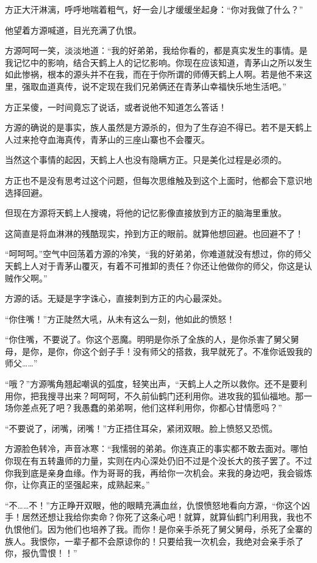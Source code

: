 \begin{this_body}
方正大汗淋漓，呼呼地喘着粗气，好一会儿才缓缓坐起身：“你对我做了什么？”

他望着方源喊道，目光充满了仇恨。

方源呵呵一笑，淡淡地道：“我的好弟弟，我给你看的，都是真实发生的事情。是我记忆中的影响，结合天鹤上人的记忆影响。你现在应该知道，青茅山之所以发生如此惨祸，根本的源头并不在我，而在于你所谓的师傅天鹤上人啊。若是他不来这里，强取血道真传，说不定现在我们兄弟俩还在青茅山幸福快乐地生活吧。”

方正呆傻，一时间竟忘了说话，或者说他不知道怎么答话！

方源的确说的是事实，族人虽然是方源杀的，但为了生存迫不得已。若不是天鹤上人过来抢夺血海真传，青茅山的三座山寨也不会覆灭。

当然这个事情的起因，天鹤上人也没有隐瞒方正。只是美化过程是必须的。

方正也不是没有思考过这个问题，但每次思维触及到这个上面时，他都会下意识地选择回避。

但现在方源将天鹤上人搜魂，将他的记忆影像直接放到方正的脑海里重放。

这简直是将血淋淋的残酷现实，拎到方正的眼前。就算他想回避。也回避不了！

“呵呵呵。”空气中回荡着方源的冷笑，“我的好弟弟，你难道就没有想过，你的师父天鹤上人对于青茅山覆灭，有着不可推卸的责任？你还让他做你的师父，你这是认贼作父啊。”

方源的话。无疑是字字诛心，直接刺到方正的内心最深处。

“你住嘴！”方正陡然大吼，从未有这么一刻，他如此的愤怒！

“你住嘴，不要说了。你这个恶魔。明明是你杀了全族的人，是你杀害了舅父舅母，是你，是你，你这个刽子手！没有师父的搭救，我早就死了。不准你诋毁我的师父……”

“哦？”方源嘴角翘起嘲讽的弧度，轻笑出声，“天鹤上人之所以救你。还不是要利用你，把我搜寻出来？呵呵呵，不久前仙鹤门还利用你。进攻我的狐仙福地。那一场你差点死了吧？我愚蠢的弟弟啊，他们这样利用你，你都心甘情愿吗？”

“不要说了，闭嘴，闭嘴！”方正捂住耳朵，紧闭双眼。脸上愤怒又恐慌。

方源脸色转冷，声音冰寒：“我懦弱的弟弟。你连真正的事实都不敢去面对。哪怕你现在有五转蛊师的力量，实则在内心深处仍旧不过是个没长大的孩子罢了。不过你我到底是亲身血缘。作为哥哥的我，再给你一次机会。来我的身边吧，我会锻炼你，让你真正的坚强起来，成熟起来。”

“不……不！”方正睁开双眼，他的眼睛充满血丝，仇恨愤怒地看向方源，“你这个凶手！居然还想让我给你卖命？你死了这条心吧！就算，就算仙鹤门利用我，我也不仇恨他们。因为他们也培养了我。而你！是你亲手杀死了舅父舅母，杀死了全寨的族人。我恨你，一辈子都不会原谅你的！只要给我一次机会，我绝对会亲手杀了你，报仇雪恨！！”


\end{this_body}
